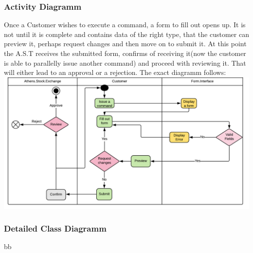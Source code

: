 \documentclass{article}
\begin{document}
\subsubsection{Activity Diagramm}
Once a Customer wishes to execute a command, a form to fill out opens up. It is not until it is complete and contains data of the right type, that the customer can preview it, perhaps request changes and then move on to submit it. At this point the A.S.T receives the submitted form, confirms of receiving it(now the customer is able to parallelly issue another command) and proceed with reviewing it. That will either lead to an approval or a rejection. The exact diagramm follows:\\
\includegraphics[scale=0.6]{activity}    

\newpage
\subsubsection{Detailed Class Diagramm}
bb

\newpage
\end{document}
